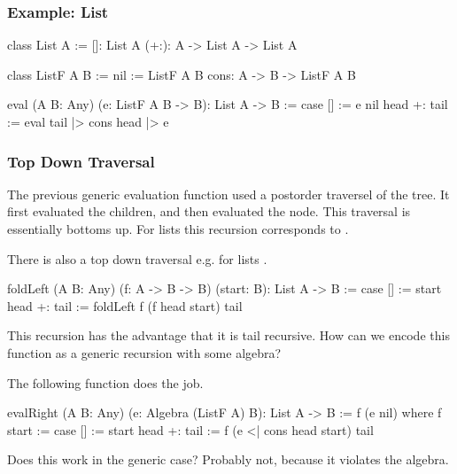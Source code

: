 \subsubsection{Example: List}

\begin{alba}
    class List A :=
        []: List A
        (+:): A -> List A -> List A

    class ListF A B :=
        nil := ListF A B
        cons: A -> B -> ListF A B

    eval (A B: Any) (e: ListF A B -> B): List A -> B
    :=
        case
            [] :=
                e nil
            head +: tail :=
                eval tail |> cons head |> e
\end{alba}




\subsubsection{Top Down Traversal}

The previous generic evaluation function used a postorder traversel of the tree.
It first evaluated the children, and then evaluated the node. This traversal is
essentially bottoms up. For lists this recursion corresponds to
.

There is also a top down traversal e.g. for lists .

\begin{alba}
    foldLeft (A B: Any) (f: A -> B -> B) (start: B): List A -> B
    :=
        case
            [] :=
                start
            head +: tail :=
                foldLeft f (f head start) tail
\end{alba}
%
This recursion has the advantage that it is tail recursive. How can we encode
this function as a generic recursion with some algebra?

The following function does the job.

\begin{alba}
    evalRight (A B: Any) (e: Algebra (ListF A) B): List A -> B
    :=
        f (e nil) where
        f start :=
            case
                [] :=
                    start
                head +: tail :=
                    f (e <| cons head start) tail
\end{alba}

Does this work in the generic case? Probably not, because it violates the
algebra.







